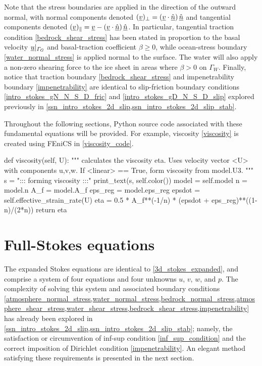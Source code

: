Note that the stress boundaries are applied in the direction of the outward normal, with normal components denoted $(\underline{v})_{\perp} = \left( \underline{v} \cdot \underline{\hat{n}} \right) \underline{\hat{n}}$ and tangential components denoted $(\underline{v})_{\Vert} = \underline{v} - \left( \underline{v} \cdot \underline{\hat{n}} \right) \underline{\hat{n}}$.
In particular, tangential traction condition \cref{bedrock_shear_stress} has been stated in proportion to the basal velocity $\underline{u} |_{\varGamma_G}$ and basal-traction coefficient $\beta \geq 0$, while ocean-stress boundary \cref{water_normal_stress} is applied normal to the surface.
The water will also apply a non-zero shearing force to the ice sheet in areas where $\beta > 0$ on $\Gamma_W$.
Finally, notice that traction boundary \cref{bedrock_shear_stress} and impenetrability boundary \cref{impenetrability} are identical to slip-friction boundary conditions \cref{intro_stokes_gN_N_S_D_fric} and \cref{intro_stokes_gD_N_S_D_slip} explored previously in \cref{ssn_intro_stokes_2d_slip,ssn_intro_stokes_2d_slip_stab}.

Throughout the following sections, Python source code associated with these fundamental equations will be provided.  For example, viscosity \cref{viscosity} is created using FEniCS in \cref{viscosity_code}. 

\begin{python}[label=viscosity_code, caption={FEniCS code used to generate viscosity $\eta$ as defined in the \texttt{Momentum} class, from which all of the momentum models of this chapter inherit.}]
def viscosity(self, U):
  """
  calculates the viscosity eta.  Uses velocity vector <U> with
  components u,v,w.  If <linear> == True, form viscosity from model.U3.
  """
  s  = "::: forming viscosity :::"
  print_text(s, self.color())
  model    = self.model
  n        = model.n
  A_f      = model.A_f
  eps_reg  = model.eps_reg
  epsdot   = self.effective_strain_rate(U)
  eta      = 0.5 * A_f**(-1/n) * (epsdot + eps_reg)**((1-n)/(2*n))
  return eta
\end{python}




\section{Full-Stokes equations} \label{ssn_full_stokes}

The expanded Stokes equations are identical to \cref{3d_stokes_expanded}, and comprise a system of four equations and four unknowns $u$, $v$, $w$, and $p$.  The complexity of solving this system and associated boundary conditions \cref{atmosphere_normal_stress,water_normal_stress,bedrock_normal_stress,atmosphere_shear_stress,water_shear_stress,bedrock_shear_stress,impenetrability} has already been explored in \cref{ssn_intro_stokes_2d_slip,ssn_intro_stokes_2d_slip_stab}; namely, the satisfaction or circumvention of inf-sup condition \cref{inf_sup_condition} and the correct imposition of Dirichlet condition \cref{impenetrability}.  An elegant method satisfying these requirements is presented in the next section.


